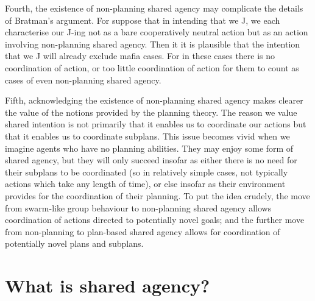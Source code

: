 \documentclass[12pt,letterpaper]{extarticle}
\begin{document}
Fourth, the existence of non-planning shared agency may complicate the details of Bratman's argument.
For suppose that in intending that we J, we each characterise our J-ing not as a bare cooperatively neutral action but as an action involving non-planning shared agency.
Then it it is plausible that the intention that we J will already exclude mafia cases.
For in these cases there is no coordination of action, or too little coordination of action for them to count as cases of even non-planning shared agency.

Fifth, acknowledging the existence of non-planning shared agency makes clearer the value of the notions provided by the planning theory.
The reason we value shared intention is not primarily that it enables us to coordinate our actions but that it enables us to coordinate subplans.
This issue becomes vivid when we imagine agents who have no planning abilities.
They may enjoy some form of shared agency, but they will only succeed insofar as either there is no need for their subplans to be coordinated (so in relatively simple cases, not typically actions which take any length of time), or else insofar as their environment provides for the coordination of their planning.
To put the idea crudely, the move from swarm-like group behaviour to non-planning shared agency allows coordination of actions directed to potentially novel goals; and the further move from non-planning to plan-based shared agency allows for coordination of potentially novel plans and subplans.


\section{What is shared agency?}
\end{document}
